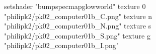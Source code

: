 setshader "bumpspecmapglowworld"
    texture 0 "philipk2/pk02_computer01b_C.png"
    texture n "philipk2/pk02_computer01b_N.png"
    texture s "philipk2/pk02_computer01b_S.png"
    texture g "philipk2/pk02_computer01b_I.png"